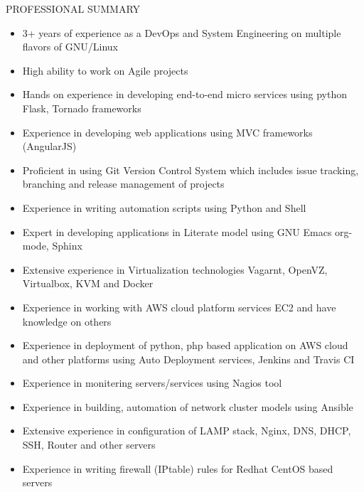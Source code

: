 \documentclass{resume} %
\begin{document}
\begin{rSection}{PROFESSIONAL SUMMARY}
  
  \begin{itemize}
    
  \item 3+ years of experience as a DevOps and System
    Engineering on multiple flavors of GNU/Linux

  \item High ability to work on Agile projects

  \item Hands on experience in developing end-to-end micro
    services using python Flask, Tornado frameworks
    
  \item Experience in developing web applications using MVC
    frameworks (AngularJS)
    
  \item Proficient in using Git Version Control System which
    includes issue tracking, branching and release
    management of projects

  \item Experience in writing automation scripts using
    Python and Shell

  \item Expert in developing applications in Literate model
    using GNU Emacs org-mode, Sphinx
    
  \item Extensive experience in Virtualization technologies
    Vagarnt, OpenVZ, Virtualbox, KVM and Docker

  \item Experience in working with AWS cloud platform
    services EC2 and have knowledge on others

  \item Experience in deployment of python, php based
    application on AWS cloud and other platforms using Auto
    Deployment services, Jenkins and Travis CI

  \item Experience in monitering servers/services using
    Nagios tool
    
  \item Experience in building, automation of network
    cluster models using Ansible
    
  \item Extensive experience in configuration of LAMP stack,
    Nginx, DNS, DHCP, SSH, Router and other servers

  \item Experience in writing firewall (IPtable) rules for
    Redhat CentOS based servers
    

\end{itemize}
\end{rSection}
\end{document}
